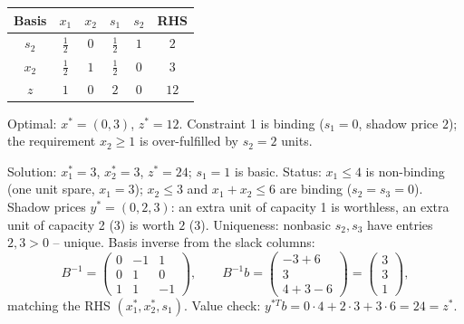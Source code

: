 \begin{solutions}
\begin{center}
        \begin{tabular}{c|cccc|c}
        Basis & $x_{1}$ & $x_{2}$ & $s_{1}$ & $s_{2}$ & RHS\\
        \hline
        $s_{2}$ & $\tfrac{1}{2}$ & $0$ & $\tfrac{1}{2}$ & $1$ & $2$\\
        $x_{2}$ & $\tfrac{1}{2}$ & $1$ & $\tfrac{1}{2}$ & $0$ & $3$\\
        \hline
        $z$ & $1$ & $0$ & $2$ & $0$ & $12$\\
        \end{tabular}
        \end{center}
        Optimal: $x^{*}=(0,3)$, $z^{*}=12$. Constraint 1 is binding
        ($s_{1}=0$, shadow price $2$); the requirement $x_{2}\ge 1$ is
        over-fulfilled by $s_{2}=2$ units.

  \item Solution: $x_{1}^{*}=3$, $x_{2}^{*}=3$, $z^{*}=24$; $s_{1}=1$ is
        basic. Status: $x_{1}\le 4$ is non-binding (one unit spare,
        $x_{1}=3$); $x_{2}\le 3$ and $x_{1}+x_{2}\le 6$ are binding
        ($s_{2}=s_{3}=0$). Shadow prices $y^{*}=(0,2,3)$: an extra unit of
        capacity 1 is worthless, an extra unit of capacity 2 (3) is worth
        $2$ ($3$). Uniqueness: nonbasic $s_{2},s_{3}$ have entries
        $2,3>0$ -- unique. Basis inverse from the slack columns:
        \[
          B^{-1}=
          \begin{pmatrix}
            0 & -1 & 1\\
            0 & 1 & 0\\
            1 & 1 & -1
          \end{pmatrix},
          \qquad
          B^{-1}b=
          \begin{pmatrix}
            -3+6\\ 3\\ 4+3-6
          \end{pmatrix}
          =\begin{pmatrix}3\\3\\1\end{pmatrix},
        \]
        matching the RHS $(x_{1}^{*},x_{2}^{*},s_{1})$. Value check:
        $y^{*T}b=0\cdot 4+2\cdot 3+3\cdot 6=24=z^{*}$.


\end{solutions}
